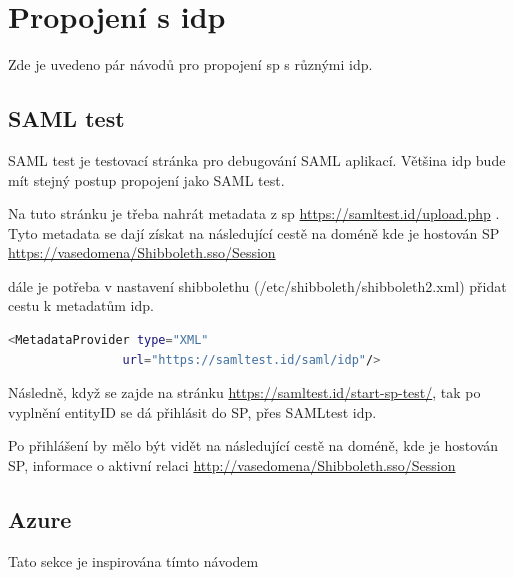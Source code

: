 \section{Propojení s idp}

Zde je uvedeno pár návodů pro propojení sp s různými idp.

\subsection{SAML test}
SAML test je testovací stránka pro debugování SAML aplikací. Většina idp bude mít stejný postup propojení jako SAML test.



Na tuto stránku je třeba nahrát metadata z sp 
\url{https://samltest.id/upload.php}  . Tyto metadata se dají získat na následující cestě na doméně kde je hostován SP \url{https://vasedomena/Shibboleth.sso/Session }

dále je potřeba v nastavení shibbolethu (/etc/shibboleth/shibboleth2.xml) přidat cestu k metadatům idp.
\begin{lstlisting}[language=Bash]
 <MetadataProvider type="XML"
                url="https://samltest.id/saml/idp"/>
\end{lstlisting}

Následně, když se zajde na stránku \url{https://samltest.id/start-sp-test/}, tak po vyplnění entityID se dá přihlásit do SP, přes SAMLtest idp.

Po přihlášení by mělo být vidět na následující cestě na doméně, kde je hostován SP, informace o aktivní relaci \url{http://vasedomena/Shibboleth.sso/Session} 



\subsection{Azure}

Tato sekce je inspirována tímto návodem\cite{AzureTutorial}


